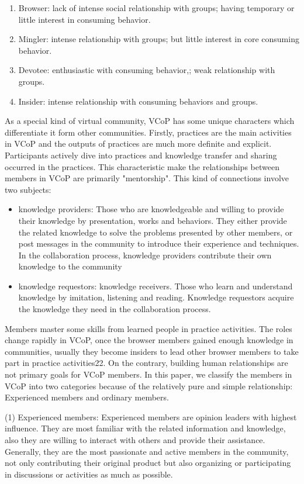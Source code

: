 \documentclass{elsarticle}
\begin{document}
\begin{enumerate}
\item Browser: lack of intense social relationship with groups; having
  temporary or little interest in consuming behavior. 
\item Mingler: intense relationship with groups; but little interest in core consuming behavior.
\item Devotee: enthusiastic with consuming behavior,; weak
  relationship with groups. 
\item  Insider: intense relationship with consuming behaviors and groups. 
\end{enumerate}


As a special kind of virtual community, VCoP has some unique
characters which differentiate it form other communities. Firstly,
practices are the main activities in VCoP and the outputs of practices
are much more definite and explicit. Participants actively dive into
practices and knowledge transfer and sharing occurred in the
practices. This characteristic make the relationships between members
in VCoP are primarily "mentorship". This kind of connections involve
two subjects:
\begin{itemize}
\item  knowledge providers: Those who are knowledgeable and willing to
  provide their knowledge by presentation, works and behaviors. They
  either provide the related knowledge to solve the problems presented
  by other members, or post messages in the community to introduce
  their experience and techniques. In the collaboration process,
  knowledge providers contribute their own knowledge to the community
\item  knowledge requestors: knowledge receivers. Those who learn and understand knowledge by imitation, listening and reading. Knowledge requestors acquire the knowledge they need in the collaboration process.
\end{itemize}
Members master some skills from
learned people in practice activities. The roles change rapidly in
VCoP, once the browser members gained enough knowledge in communities,
usually they become insiders to lead other browser members to take
part in practice activities22. On the contrary, building human
relationships are not primary goals for VCoP members.  In this paper,
we classify the members in VCoP into two categories because of the
relatively pure and simple relationship:   Experienced members and  ordinary members.

(1)  Experienced members: Experienced members are opinion leaders with highest influence. They are most familiar with the related information and knowledge, also they are willing to interact with others and provide their assistance. Generally, they are the most passionate and active members in the community, not only contributing their original product but also organizing or participating in discussions or activities as much as possible. 
\end{document}
